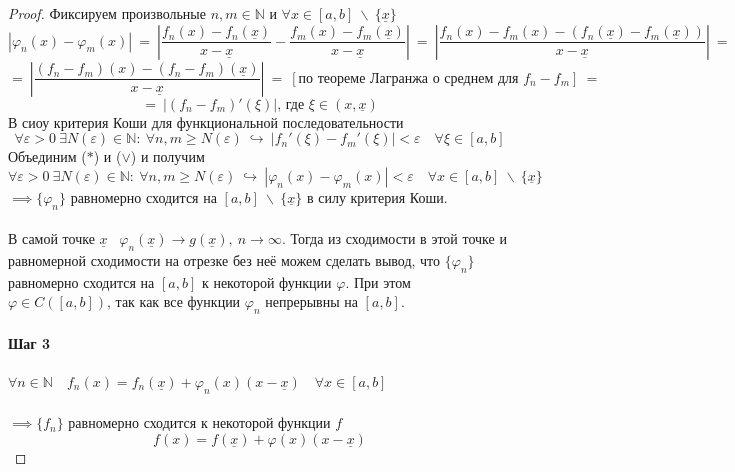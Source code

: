 \documentclass[11pt]{article}
\begin{document}
\begin{proof}
    Фиксируем произвольные $n, m \in \mathbb{N}$ и $\forall x \in [a, b] \ 
    \backslash \ \{\underline{x}\}$
    \[\left\lvert \varphi_n(x) - \varphi_m(x) \right\rvert \ = \ 
    \left\lvert \frac{f_n(x) - f_n(\underline{x})}{x - \underline{x}} - 
    \frac{f_m(x) - f_m(\underline{x})}{x - \underline{x}} \right\rvert \ 
    = \ \left\lvert \frac{f_n(x) - f_m(x) - (f_n(\underline{x}) - f_m
    (\underline{x}))}{x - \underline{x}} \right\rvert \ =\]
    \[= \ \left\lvert \frac{(f_n - f_m)(x) - (f_n - f_m)(\underline{x})}{x - 
    \underline{x}} \right\rvert \ = \ [\text{по теореме Лагранжа о среднем 
    для $f_n - f_m$}] \ =\]
    \[= \ \left\lvert (f_n - f_m)'(\xi) \right\rvert \text{, где } \xi \in 
    (x, \underline{x}) \tag{$\ast$}\]
    В сиоу критерия Коши для функциональной последовательности 
    \[\forall \varepsilon > 0 \ \exists N(\varepsilon) \in \mathbb{N}: \ 
    \forall n, m \geq N(\varepsilon) \ \hookrightarrow \ \left\lvert 
    f_n'(\xi) - f_m'(\xi) \right\rvert < \varepsilon \quad \forall \xi 
    \in [a, b] \tag{$\vee$}\]
    Объединим ($\ast$) и ($\vee$) и получим 
    \[\forall \varepsilon > 0 \ \exists N(\varepsilon) \in \mathbb{N}: \ 
    \forall n, m \geq N(\varepsilon) \ \hookrightarrow \ \left\lvert 
    \varphi_n(x) - \varphi_m(x) \right\rvert < \varepsilon \quad \forall 
    x \in [a, b] \ \backslash \ \{\underline{x}\}\]
    $\implies \{\varphi_n\}$ равномерно сходится на $[a, b] \ \backslash \ 
    \{\underline{x}\}$ в силу критерия Коши. \\ \\
    В самой точке $\underline{x}$ \ $\varphi_n(\underline{x}) \to 
    g(\underline{x}), \ n \to \infty$. Тогда из сходимости в этой точке и 
    равномерной сходимости на отрезке без неё можем сделать вывод, что 
    $\{\varphi_n\}$ равномерно сходится на $[a, b]$ к некоторой функции 
    $\varphi$. При этом $\varphi \in C([a, b])$, так как все функции 
    $\varphi_n$ непрерывны на $[a, b]$.

    \paragraph{Шаг 3}

    $\forall n \in \mathbb{N} \quad f_n(x) = f_n(\underline{x}) + 
    \varphi_n(x)(x - \underline{x}) \quad \forall x \in [a, b]$ \\ \\
    $\implies \{f_n\}$ равномерно сходится к некоторой функции $f$
    \[f(x) = f(\underline{x}) + \varphi(x)(x - \underline{x}) \tag{$\star$}\]


\end{proof}
\end{document}
